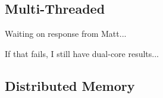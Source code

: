 \documentclass[twoside,leqno,twocolumn]{article}
\newcommand{\authornote}[1]{\footnote{Note to self: #1}}
\newcommand{\authorsnote}[1]{\authornote{#1}}
\newcommand{\fig}[1]{Figure~\ref{fig:#1}}
\begin{document}

\subsection{Multi-Threaded}

Waiting on response from Matt...

If that fails, I still have dual-core results...


\subsection{Distributed Memory}
\end{document}
